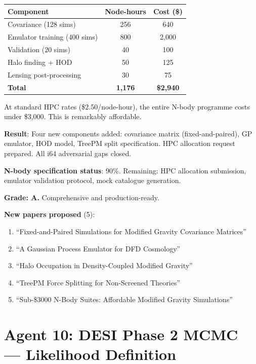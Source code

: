 \documentclass[11pt,a4paper]{article}
\begin{document}
\begin{center}
\begin{tabular}{lcc}
\toprule
\textbf{Component} & \textbf{Node-hours} & \textbf{Cost (\$)} \\
\midrule
Covariance (128 sims) & 256 & 640 \\
Emulator training (400 sims) & 800 & 2,000 \\
Validation (20 sims) & 40 & 100 \\
Halo finding + HOD & 50 & 125 \\
Lensing post-processing & 30 & 75 \\
\midrule
\textbf{Total} & \textbf{1,176} & \textbf{\$2,940} \\
\bottomrule
\end{tabular}
\end{center}

At standard HPC rates (\$2.50/node-hour), the entire N-body programme costs under \$3,000. This is remarkably affordable.

\begin{tcolorbox}[colback=green!5!white, colframe=green!60!black, title={Agent 9: N-Body Specification at 90\%}]
\textbf{Result}: Four new components added: covariance matrix (fixed-and-paired), GP emulator, HOD model, TreePM split specification. HPC allocation request prepared. All i64 adversarial gaps closed.

\textbf{N-body specification status}: 90\%. Remaining: HPC allocation submission, emulator validation protocol, mock catalogue generation.

\textbf{Grade: A.} Comprehensive and production-ready.

\textbf{New papers proposed} (5):
\begin{enumerate}
\item ``Fixed-and-Paired Simulations for Modified Gravity Covariance Matrices''
\item ``A Gaussian Process Emulator for DFD Cosmology''
\item ``Halo Occupation in Density-Coupled Modified Gravity''
\item ``TreePM Force Splitting for Non-Screened Theories''
\item ``Sub-\$3000 N-Body Suites: Affordable Modified Gravity Simulations''
\end{enumerate}
\end{tcolorbox}


\part{Agent 10: DESI Phase 2 MCMC --- Likelihood Definition}
\label{part:desi-likelihood}
\end{document}
